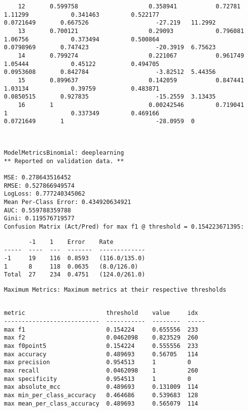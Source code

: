 \documentclass[11pt]{article}
\begin{document}
\begin{verbatim}
    12       0.599758                    0.358941           0.72781   1.11299            0.341463         0.522177                    0.0721649       0.667526                   -27.219   11.2992
    13       0.700121                    0.29093            0.796081  1.06756            0.373494         0.500864                    0.0798969       0.747423                   -20.3919  6.75623
    14       0.799274                    0.221067           0.961749  1.05444            0.45122          0.494705                    0.0953608       0.842784                   -3.82512  5.44356
    15       0.899637                    0.142059           0.847441  1.03134            0.39759          0.483871                    0.0850515       0.927835                   -15.2559  3.13435
    16       1                           0.00242546         0.719041  1                  0.337349         0.469166                    0.0721649       1                          -28.0959  0
    \end{verbatim}

    
    \begin{Verbatim}[commandchars=\\\{\}]


ModelMetricsBinomial: deeplearning
** Reported on validation data. **

MSE: 0.278643516452
RMSE: 0.527866949574
LogLoss: 0.777240345062
Mean Per-Class Error: 0.434920634921
AUC: 0.559788359788
Gini: 0.119576719577
Confusion Matrix (Act/Pred) for max f1 @ threshold = 0.154223671395: 

    \end{Verbatim}

    
    \begin{verbatim}
       -1    1    Error    Rate
-----  ----  ---  -------  -------------
-1     19    116  0.8593   (116.0/135.0)
1      8     118  0.0635   (8.0/126.0)
Total  27    234  0.4751   (124.0/261.0)
    \end{verbatim}

    
    \begin{Verbatim}[commandchars=\\\{\}]
Maximum Metrics: Maximum metrics at their respective thresholds


    \end{Verbatim}

    
    \begin{verbatim}
metric                       threshold    value     idx
---------------------------  -----------  --------  -----
max f1                       0.154224     0.655556  233
max f2                       0.0462098    0.823529  260
max f0point5                 0.154224     0.555556  233
max accuracy                 0.489693     0.56705   114
max precision                0.954513     1         0
max recall                   0.0462098    1         260
max specificity              0.954513     1         0
max absolute_mcc             0.489693     0.131009  114
max min_per_class_accuracy   0.464686     0.539683  128
max mean_per_class_accuracy  0.489693     0.565079  114
    \end{verbatim}
\end{document}
